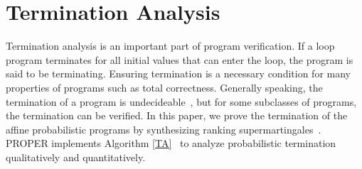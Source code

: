 \documentclass[sigconf,review, anonymous]{acmart}
\begin{document}
\section{Termination Analysis}
Termination analysis is an important part of program verification. If a loop program terminates for all initial values that can enter the loop, the program is said to be terminating.  Ensuring termination is a necessary condition for many properties of programs such as total correctness. Generally speaking, the termination of a program is undecideable~\cite{Turing1936On}, but for some subclasses of programs, the termination can be verified. In this paper, we prove the termination of the affine probabilistic programs by synthesizing ranking supermartingales~\cite{Chakarov2013Martingales}. PROPER implements Algorithm \ref{TA}~\cite{cha2015algorithmic,kris2016termination} to analyze probabilistic termination qualitatively and quantitatively. 
\end{document}
